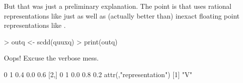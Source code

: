 \documentclass{article}
\begin{document}
But that was just a preliminary explanation.  The point is that \verb@scdd@
uses rational representations like \verb@quuxq@ just as well as (actually
better than) inexact floating point representations like \verb@quux@.
\begin{Schunk}
\begin{Sinput}
> outq <- scdd(quuxq)
> print(outq)
\end{Sinput}
\end{Schunk}
Oops!  Excuse the verbose mess.
\begin{Schunk}
\begin{Soutput}
     [,1] [,2] [,3] [,4] [,5]
[1,]    0    1  0.4  0.0  0.6
[2,]    0    1  0.0  0.8  0.2
attr(,"representation")
[1] "V"
\end{Soutput}
\end{Schunk}
\end{document}
